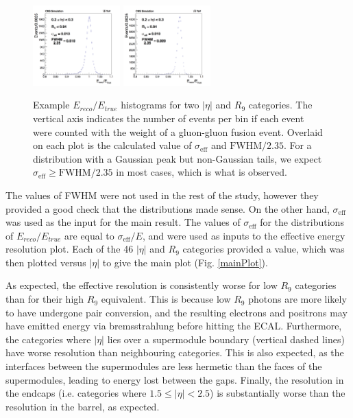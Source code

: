 \documentclass[10pt]{article}
\begin{document}
\begin{figure}[h!]

  \centering
\includegraphics[width=0.3\textwidth]{"Hist2_mva"}\quad\quad\quad
\includegraphics[width=0.3\textwidth]{"Hist25_mva"}
\caption{Example $E_{reco}/E_{true} $ histograms for two $|\eta|$ and $R_{9}$ categories. The vertical axis indicates the number of events per bin if each event were counted with the weight of a gluon-gluon fusion event. Overlaid on each plot is the calculated value of  $\sigma_{\text{eff}}$ and $\text{FWHM}/2.35$. For a distribution with a Gaussian peak but non-Gaussian tails, we expect $\sigma_{\text{eff}} \geq \text{FWHM}/2.35$ in most cases, which is what is observed.}
\label{EtrueEreco}
\end{figure}

The values of FWHM were not used in the rest of the study, however they provided a good check that the distributions made sense. On the other hand, $\sigma_{\text{eff}}$ was used as the input for the main result. The values of $\sigma_{\text{eff}}$ for the distributions of $E_{reco}/E_{true}$ are equal to $\sigma_{\text{eff}}/E$, and were used as inputs to the effective energy resolution plot. Each of the 46 $|\eta|$ and $R_{9}$ categories provided a value, which was then plotted versus $|\eta|$ to give the main plot (Fig. \ref{mainPlot}).

As expected, the effective resolution is consistently worse for low $R_{9}$ categories than for their high $R_9$ equivalent. This is because low $R_9$ photons are more likely to have undergone pair conversion, and the resulting electrons and positrons may have emitted energy via bremsstrahlung before hitting the ECAL. Furthermore, the categories where $|\eta|$ lies over a supermodule boundary (vertical dashed lines) have worse resolution than neighbouring categories. This is also expected, as the interfaces between the supermodules are less hermetic than the faces of the supermodules, leading to energy lost between the gaps. Finally, the resolution in the endcaps (i.e. categories where $1.5\leq |\eta| <2.5$) is substantially worse than the resolution in the barrel, as expected.
\end{document}

